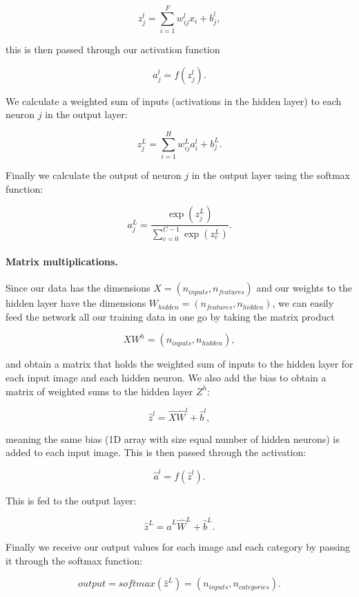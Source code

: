 $$ z_{j}^{l} = \sum_{i=1}^{F} w_{ij}^{l} x_i + b_{j}^{l},$$

this is then passed through our activation function  

$$ a_{j}^{l} = f(z_{j}^{l}) .$$  

We calculate a weighted sum of inputs (activations in the hidden layer) to each neuron $j$ in the output layer:  

$$ z_{j}^{L} = \sum_{i=1}^{H} w_{ij}^{L} a_{i}^{l} + b_{j}^{L}.$$  

Finally we calculate the output of neuron $j$ in the output layer using the softmax function:  

$$ a_{j}^{L} = \frac{\exp{(z_j^{L})}}
{\sum_{c=0}^{C-1} \exp{(z_c^{L})}} .$$  

\paragraph{Matrix multiplications.}
Since our data has the dimensions $X = (n_{inputs}, n_{features})$ and our weights to the hidden
layer have the dimensions  
$W_{hidden} = (n_{features}, n_{hidden})$,
we can easily feed the network all our training data in one go by taking the matrix product  

$$ X W^{h} = (n_{inputs}, n_{hidden}),$$ 

and obtain a matrix that holds the weighted sum of inputs to the hidden layer
for each input image and each hidden neuron.    
We also add the bias to obtain a matrix of weighted sums to the hidden layer $Z^{h}$:  

$$ \hat{z}^{l} = \hat{X} \hat{W}^{l} + \hat{b}^{l} ,$$

meaning the same bias (1D array with size equal number of hidden neurons) is added to each input image.  
This is then passed through the activation:  

$$ \hat{a}^{l} = f(\hat{z}^l) .$$  

This is fed to the output layer:  

$$ \hat{z}^{L} = \hat{a}^{L} \hat{W}^{L} + \hat{b}^{L} .$$

Finally we receive our output values for each image and each category by passing it through the softmax function:  

$$ output = softmax (\hat{z}^{L}) = (n_{inputs}, n_{categories}) .$$





































